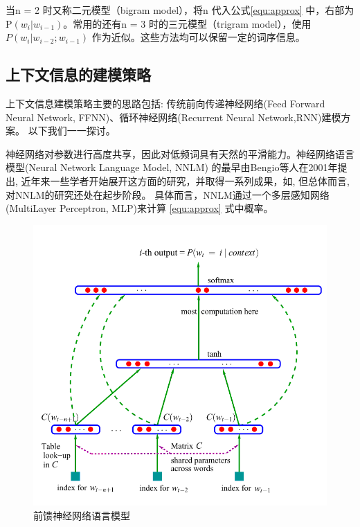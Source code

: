 \documentclass[twoside]{buaathesis}
\begin{document}
当n = 2 时又称二元模型（bigram model），将n 代入公式\ref{equ:approx} 中，右部为P$(w_i|w_{i-1})$。常用的还有n = 3 时的三元模型（trigram model），使用$P(w_i |w_{i-2};w_{i-1})$ 作为近似。这些方法均可以保留一定的词序信息。

\subsection{上下文信息的建模策略}
上下文信息建模策略主要的思路包括: 传统前向传递神经网络(Feed Forward Neural Network, FFNN)、循环神经网络(Recurrent Neural Network,RNN)建模方案。 以下我们一一探讨。

神经网络对参数进行高度共享，因此对低频词具有天然的平滑能力。神经网络语言模型(Neural Network Language Model, NNLM) 的最早由Bengio等人在2001年提出\cite{DBLP:conf/nips/BengioDV00}, 近年来一些学者开始展开这方面的研究，并取得一系列成果，如\cite{DBLP:conf/acl/BaroniDK14,DBLP:journals/sigkdd/BellK07,DBLP:journals/pami/BengioCV13,DBLP:journals/tnn/BengioSF94}, 但总体而言, 对NNLM的研究还处在起步阶段。
具体而言，NNLM通过一个多层感知网络(MultiLayer Perceptron, MLP)来计算 \ref{equ:approx} 式中概率。
\begin{figure}
  \centering
  \includegraphics[width=0.7\linewidth]{./figures/nplm.png}
  \caption{前馈神经网络语言模型}\label{fig:nplm}
\end{figure}
\end{document}
